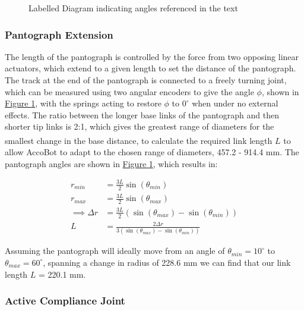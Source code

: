 \documentclass[11pt]{article}		%
\newcommand{\supercite}[1]{\textsuperscript{\cite{#1}}}		%
\newcommand{\figref}[1]{\hyperref[#1]{Figure \ref*{#1}}}    %
\begin{document}
\begin{figure}[h]
\begin{multicols}{2}
					\caption{Labelled Diagram indicating angles referenced in the text}
					\label{legDiagram}
				\end{multicols}
			\end{figure}
			
			\subsubsection{Pantograph Extension}
			
				The length of the pantograph is controlled by the force from two opposing linear actuators, which extend to a given length to set the distance of the pantograph.
				The track at the end of the pantograph is connected to a freely turning joint, which can be measured using two angular encoders to give the angle $\phi$, shown in \figref{legDiagram}, with the springs acting to restore $\phi$ to $0^\circ$ when under no external effects.
				The ratio between the longer base links of the pantograph and then shorter tip links is 2:1, which gives the greatest range of diameters for the smallest change in the base distance\supercite{okada1987mogrer}, to calculate the required link length $L$ to allow AccoBot to adapt to the chosen range of diameters, 457.2 - 914.4 mm.
				The pantograph angles are shown in \figref{legDiagram}, which results in:
				
				\begin{align}
					r_{min} &= \frac{3L}{2} \sin \left( \theta_{min} \right) \label{rMin}
					\\
					r_{max} &= \frac{3L}{2} \sin \left( \theta_{max} \right)
					\\
					\implies \Delta r &= \frac{3L}{2} \left( \sin \left( \theta_{max} \right) - \sin \left( \theta_{min} \right) \right)
					\\
					L &= \frac{2 \Delta r}{3 \left( \sin \left( \theta_{max} \right) - \sin \left( \theta_{min} \right) \right)}
				\end{align}
							
				Assuming the pantograph will ideally move from an angle of $\theta_{min} = 10^\circ$ to $\theta_{max} = 60^\circ$, spanning a change in radius of 228.6 mm we can find that our link length $L$ = 220.1 mm.
			
			\subsubsection{Active Compliance Joint}
			
\end{document}
